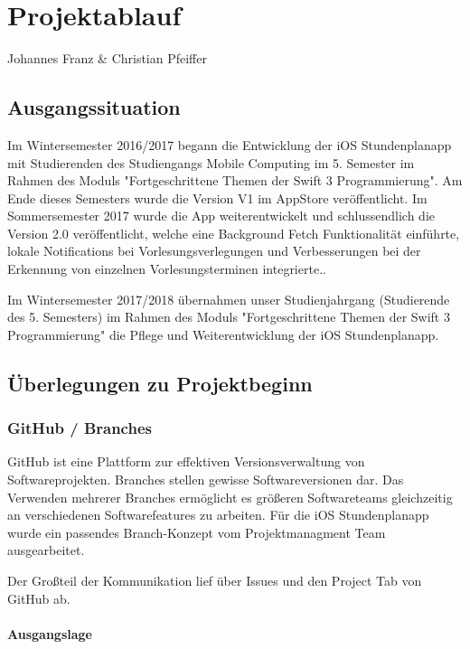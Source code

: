 \chapter{Projektablauf}
Johannes Franz \& Christian Pfeiffer

\section{Ausgangssituation}

Im Wintersemester 2016/2017 begann die Entwicklung der iOS Stundenplanapp mit Studierenden des Studiengangs Mobile Computing im 5. Semester im Rahmen des Moduls "Fortgeschrittene Themen der Swift 3 Programmierung". Am Ende dieses Semesters wurde die Version V1 im AppStore veröffentlicht. Im Sommersemester 2017 wurde die App weiterentwickelt und schlussendlich die Version 2.0 veröffentlicht, welche eine Background Fetch Funktionalität einführte, lokale Notifications bei Vorlesungsverlegungen und Verbesserungen bei der Erkennung von einzelnen Vorlesungsterminen integrierte..

Im Wintersemester 2017/2018 übernahmen unser Studienjahrgang (Studierende des 5. Semesters) im Rahmen des Moduls "Fortgeschrittene Themen der Swift 3 Programmierung" die Pflege und Weiterentwicklung der iOS Stundenplanapp.


\newpage
\section{Überlegungen zu Projektbeginn}

\subsection{GitHub / Branches}
GitHub ist eine Plattform zur effektiven Versionsverwaltung von Softwareprojekten. Branches stellen gewisse Softwareversionen dar. Das Verwenden mehrerer Branches ermöglicht es größeren Softwareteams gleichzeitig an verschiedenen Softwarefeatures zu arbeiten.
Für die iOS Stundenplanapp wurde ein passendes Branch-Konzept vom Projektmanagment Team ausgearbeitet.

Der Großteil der Kommunikation lief über Issues und den Project Tab von GitHub ab.

\subsubsection{Ausgangslage}

